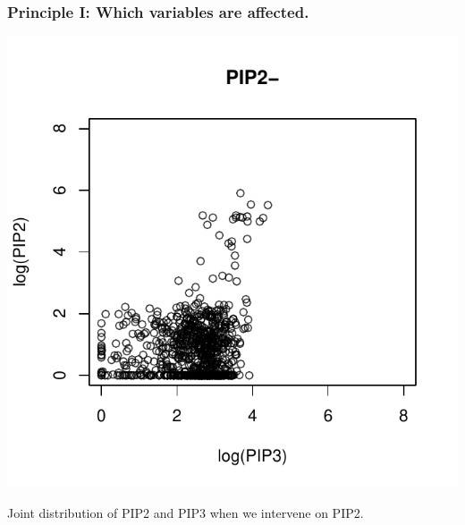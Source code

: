 \documentclass{beamer}
\begin{document}
\begin{frame}
\frametitle{Principle I: Which variables are affected.}

\begin{center}
\includegraphics[scale = 0.5]{../images/plot01_03.pdf}
\end{center}

Joint distribution of PIP2 and PIP3 when we intervene on PIP2.

\end{frame}
\end{document}
